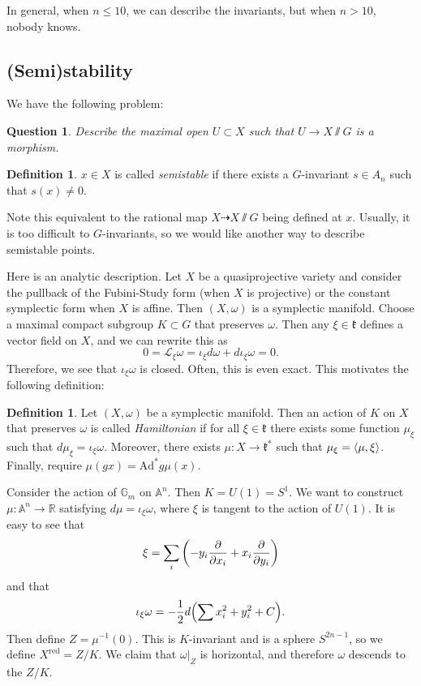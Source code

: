 \documentclass[leqno, openany]{memoir}
\newtheorem{quest}[thm]{Question}
\theoremstyle{definition}
\newtheorem{defn}[thm]{Definition}
\theoremstyle{remark}
\theoremstyle{plain}
\theoremstyle{definition}
\theoremstyle{remark}
\newcommand{\A}{\mathbb{A}}
\newcommand{\R}{\mathbb{R}}
\newcommand{\mc}[1]{\mathcal{#1}}
\newcommand{\mf}[1]{\mathfrak{#1}}
\newcommand{\mr}[1]{\mathrm{#1}}
\begin{document}
In general, when $n \leq 10$, we can describe the invariants, but when $n >
10$, nobody knows.

\subsection{(Semi)stability}%

We have the following problem: \begin{quest} Describe the maximal open $U
\subset X$ such that $U \to X \sslash G$ is a morphism.  \end{quest}

\begin{defn} $x \in X$ is called \textit{semistable} if there exists a
$G$-invariant $s \in A_n$ such that $s(x) \neq 0$.  \end{defn}

Note this equivalent to the rational map $X \dashrightarrow X \sslash G$ being
defined at $x$. Usually, it is too difficult to $G$-invariants, so we would
like another way to describe semistable points. 

Here is an analytic description. Let $X$ be a quasiprojective variety and
consider the pullback of the Fubini-Study form (when $X$ is projective) or the
constant symplectic form when $X$ is affine. Then $(X, \omega)$ is a symplectic
manifold. Choose a maximal compact subgroup $K \subset G$ that preserves
$\omega$. Then any $\xi \in \mf{k}$ defines a vector field on $X$, and we can
rewrite this as \[ 0 = \mc{L}_{\xi} \omega = \iota_{\xi} d \omega + d
\iota_{\xi} \omega = 0. \] Therefore, we see that $\iota_{\xi} \omega$ is
closed. Often, this is even exact. This motivates the following definition:

\begin{defn} Let $(X, \omega)$ be a symplectic manifold. Then an action of $K$
    on $X$ that preserves $\omega$ is called \textit{Hamiltonian} if for all
    $\xi \in \mf{k}$ there exists some function $\mu_{\xi}$ such that $d
    \mu_{\xi} = \iota_{\xi} \omega$. Moreover, there exists $\mu: X \to
    \mf{k}^*$ such that $\mu_{\xi} = \ev{ \mu, \xi }$. Finally, require
    $\mu(gx) = \mr{Ad}^* g \mu(x)$.  \end{defn}

Consider the action of $\mathbb{G}_m$ on $\A^n$. Then $K = U(1) = S^1$. We want
to construct $\mu: \A^n \to \R$ satisfying $d \mu = \iota_{\xi} \omega$, where
$\xi$ is tangent to the action of $U(1)$. It is easy to see that \[ \xi =
\sum_i \qty( -y_i \pdv{x_i} + x_i \pdv{y_i} ) \] and that \[ \iota_{\xi} \omega
= -\frac{1}{2} d \qty( \sum x_i^2 + y_i^2  + C). \] Then define $Z =
\mu^{-1}(0)$. This is $K$-invariant and is a sphere $S^{2n-1}$, so we define
$X^{\mr{red}} = Z/K$. We claim that $\omega |_Z$ is horizontal, and therefore
$\omega$ descends to the $Z/K$.
\end{document}
